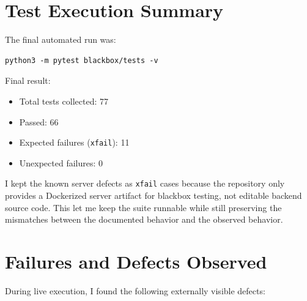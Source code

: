 \documentclass[12pt]{article}
\begin{document}
\section{Test Execution Summary}
The final automated run was:

\begin{verbatim}
python3 -m pytest blackbox/tests -v
\end{verbatim}

Final result:

\begin{itemize}
  \item Total tests collected: 77
  \item Passed: 66
  \item Expected failures (\texttt{xfail}): 11
  \item Unexpected failures: 0
\end{itemize}

I kept the known server defects as \texttt{xfail} cases because the repository only provides a Dockerized server artifact for blackbox testing, not editable backend source code. This let me keep the suite runnable while still preserving the mismatches between the documented behavior and the observed behavior.

\section{Failures and Defects Observed}
During live execution, I found the following externally visible defects:
\end{document}
